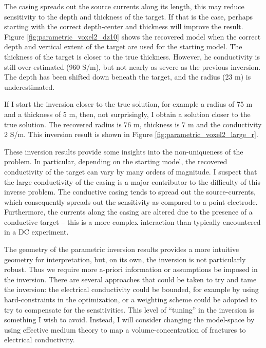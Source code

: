 The casing spreads out the source currents along its length, this may reduce sensitivity to the depth and thickness of the target. If that is the case, perhaps starting with the correct depth-center and thickness will improve the result. Figure \ref{fig:parametric_voxel2_dz10} shows the recovered model when the correct depth and vertical extent of the target are used for the starting model. The thickness of the target is closer to the true thickness. However, he conductivity is still over-estimated (960 S/m), but not nearly as severe as the previous inversion. The depth has been shifted down beneath the target, and the radius (23 m) is underestimated.




If I start the inversion closer to the true solution, for example a radius of 75 m and a thickness of 5 m, then, not surprisingly, I obtain a solution closer to the true solution. The recovered radius is 76 m, thickness is 7 m and the conductivity 2 S/m. This inversion result is shown in Figure \ref{fig:parametric_voxel2_large_r}.




These inversion results provide some insights into the non-uniqueness of the problem. In particular, depending on the starting model, the recovered conductivity of the target can vary by many orders of magnitude. I suspect that the large conductivity of the casing is a major contributor to the difficulty of this inverse problem. The conductive casing tends to spread out the source-currents, which consequently spreads out the sensitivity as compared to a point electrode. Furthermore, the currents along the casing are altered due to the presence of a conductive target -- this is a more complex interaction than typically encountered in a DC experiment.

The geometry of the parametric inversion results provides a more intuitive geometry for interpretation, but, on its own, the inversion is not particularly robust. Thus we require more a-priori information or assumptions be imposed in the inversion. There are several approaches that could be taken to try and tame the inversion: the electrical conductivity could be bounded, for example by using hard-constraints in the optimization, or a weighting scheme could be adopted to try to compensate for the sensitivities. This level of ``tuning'' in the inversion is something I wish to avoid. Instead, I will consider changing the model-space by using effective medium theory to map a volume-concentration of fractures to electrical conductivity.
